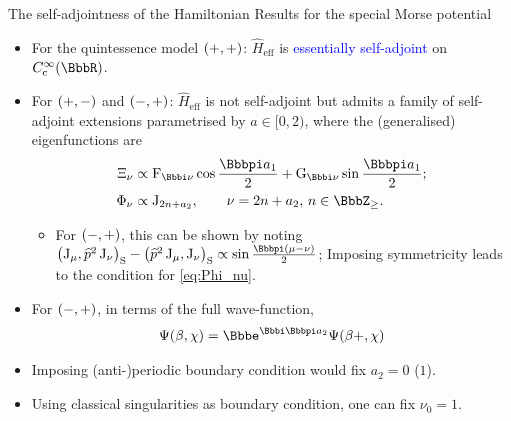 \documentclass[8pt]{beamer}
\begin{document}
\begin{frame}%
{The self-adjointness of the Hamiltonian}%
{Results for the special Morse potential }
\begin{itemize}
\item For the quintessence model ${\left(+, +\right)}$: $\widehat{H}_\text{eff}$ is
\textcolor{blue}{essentially self-adjoint} on
$\rfun{C_\text{c}^{\infty}}{\BbbR}$.

\item For ${\left(+, -\right)}$ and ${\left(-, +\right)}$:
$\widehat{H}_\text{eff}$ is \alert{not self-adjoint} but admits a family of
self-adjoint extensions parametrised by $a \in [0,2)$, where the (generalised)
eigenfunctions are
\begin{align}
\Xi_\nu &\propto \BesselF_{\ii\nu}\cos\frac{\pp a_1}{2}
+ \BesselG_{\ii\nu}\sin\frac{\pp a_1}{2}; \\
\Phi_{\nu} &\propto \BesselJ_{2n+a_2},\qquad \nu = 2n+a_2,\, n \in \BbbZ_\ge.
\label{eq:Phi_nu}
\end{align}

\begin{itemize}
\item For ${\left(-, +\right)}$, this can be shown by noting
$\rbr{\BesselJ_{\mu}, \widehat{p}^2 \BesselJ_{\nu}}_\text{S} - 
\rbr{\widehat{p}^2 \BesselJ_{\mu}, \BesselJ_{\nu}}_\text{S} \propto
\sin \frac{\pp\rbr{\mu-\nu}}{2}$;
Imposing symmetricity leads to the condition for \cref{eq:Phi_nu}.
\end{itemize}

\item For ${\left(-, +\right)}$, in terms of the full wave-function,
\begin{align}
\rfun{\Psi}{\beta,\chi} = \ee^{\ii\pp a_2} \rfun{\Psi}{\beta+,\chi}
\end{align}

\item Imposing (anti-)periodic boundary condition would fix $a_2 = 0$ ($1$).

\item Using classical singularities as boundary condition, one can fix
$\nu_0 = 1$.

\end{itemize}
\end{frame}
\end{document}
